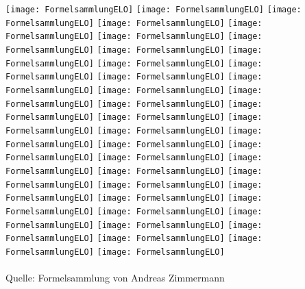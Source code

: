 \texttt{[image: FormelsammlungELO]}\newpage
\texttt{[image: FormelsammlungELO]}\newpage
\texttt{[image: FormelsammlungELO]}\newpage
\texttt{[image: FormelsammlungELO]}\newpage
\texttt{[image: FormelsammlungELO]}\newpage
\texttt{[image: FormelsammlungELO]}\newpage
\texttt{[image: FormelsammlungELO]}\newpage
\texttt{[image: FormelsammlungELO]}\newpage
\texttt{[image: FormelsammlungELO]}\newpage
\texttt{[image: FormelsammlungELO]}\newpage
\texttt{[image: FormelsammlungELO]}\newpage
\texttt{[image: FormelsammlungELO]}\newpage
\texttt{[image: FormelsammlungELO]}\newpage
\texttt{[image: FormelsammlungELO]}\newpage
\texttt{[image: FormelsammlungELO]}\newpage
\texttt{[image: FormelsammlungELO]}\newpage
\texttt{[image: FormelsammlungELO]}\newpage
\texttt{[image: FormelsammlungELO]}\newpage
\texttt{[image: FormelsammlungELO]}\newpage
\texttt{[image: FormelsammlungELO]}\newpage
\texttt{[image: FormelsammlungELO]}\newpage
\texttt{[image: FormelsammlungELO]}\newpage
\texttt{[image: FormelsammlungELO]}\newpage
\texttt{[image: FormelsammlungELO]}\newpage
\texttt{[image: FormelsammlungELO]}\newpage
\texttt{[image: FormelsammlungELO]}\newpage
\texttt{[image: FormelsammlungELO]}\newpage
\texttt{[image: FormelsammlungELO]}\newpage
\texttt{[image: FormelsammlungELO]}\newpage
\texttt{[image: FormelsammlungELO]}\newpage
\texttt{[image: FormelsammlungELO]}\newpage
\texttt{[image: FormelsammlungELO]}\newpage
\texttt{[image: FormelsammlungELO]}\newpage
\texttt{[image: FormelsammlungELO]}\newpage
\texttt{[image: FormelsammlungELO]}\newpage
\texttt{[image: FormelsammlungELO]}\newpage
\texttt{[image: FormelsammlungELO]}\newpage
\texttt{[image: FormelsammlungELO]}
\\
\\
Quelle: Formelsammlung von Andreas Zimmermann
